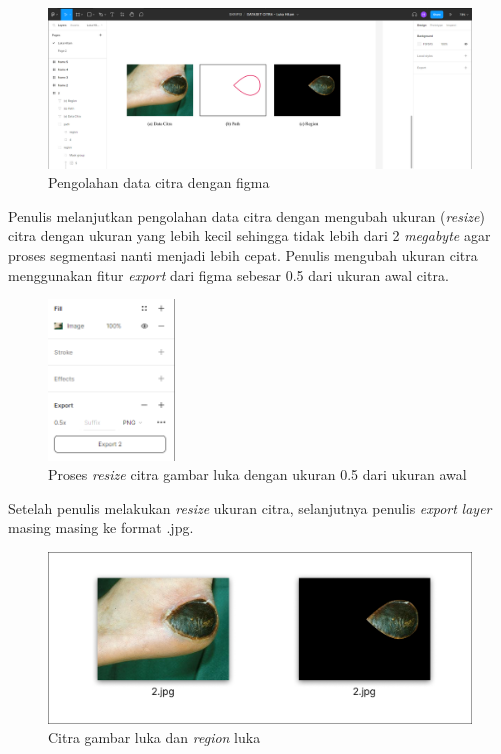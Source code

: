 \begin{figure}[H]
	\centering{}
	\includegraphics[width=\textwidth]{gambar/gambar-3_3.png}
	\caption{Pengolahan data citra dengan figma}
  \end{figure}

Penulis melanjutkan pengolahan data citra dengan mengubah ukuran (\emph{resize})
citra dengan ukuran yang lebih kecil sehingga tidak lebih dari 2 \emph{megabyte} 
agar proses segmentasi nanti menjadi lebih cepat. Penulis mengubah ukuran citra 
menggunakan fitur \emph{export} dari figma sebesar 0.5 dari ukuran awal citra.

\begin{figure}[H]
	\centering{}
	\includegraphics[width=0.3\textwidth]{gambar/gambar-3_4.png}
	\caption{Proses \emph{resize} citra gambar luka dengan ukuran 0.5 dari ukuran awal}
  \end{figure}

Setelah penulis melakukan \emph{resize} ukuran citra, selanjutnya penulis \emph{export}
\emph{layer} masing masing ke format .jpg.

  \begin{figure}[H]
	\centering{}
	\includegraphics[width=\textwidth]{gambar/gambar-3_5.png}
	\caption{Citra gambar luka dan \emph{region} luka}
  \end{figure}


